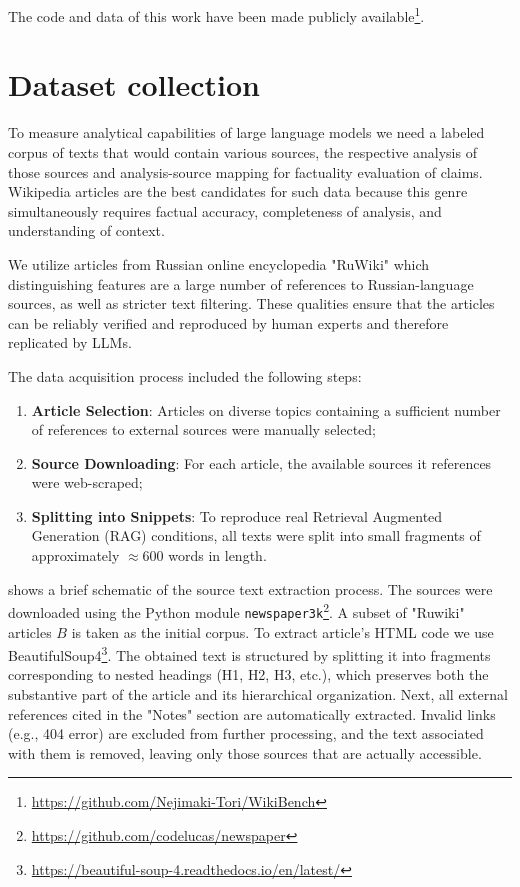 \documentclass{superfri}
\begin{document}
The code and data of this work have been made publicly available\footnote{\url{https://github.com/Nejimaki-Tori/WikiBench}}.

\section{Dataset collection}
To measure analytical capabilities of large language models we need a labeled corpus of texts that would contain various sources, 
the respective analysis of those sources and analysis-source mapping for factuality evaluation of claims. 
Wikipedia articles are the best candidates for such data because this genre simultaneously requires factual accuracy, completeness of analysis, 
and understanding of context.

We utilize articles from Russian online encyclopedia "RuWiki" which distinguishing features are a large number of references to Russian-language sources, 
as well as stricter text filtering. These qualities ensure that the articles can be reliably verified and reproduced by human experts and therefore replicated by LLMs.

The data acquisition process included the following steps:
\begin{enumerate}
\item \textbf{Article Selection}: Articles on diverse topics containing a sufficient number of references to external sources were manually selected;
\item \textbf{Source Downloading}: For each article, the available sources it references were web-scraped;
\item \parbox[t]{0.9\textwidth}{\textbf{Splitting into Snippets}: To reproduce real Retrieval Augmented Generation (RAG) conditions, all texts were split into small fragments of approximately $\approx 600$ words in length.}
\end{enumerate}



 shows a brief schematic of the source text extraction process. The sources were downloaded using the Python module \texttt{newspaper3k}\footnote{\url{https://github.com/codelucas/newspaper}}.
A subset of "Ruwiki" articles \(B\) is taken as the initial corpus.
To extract article's HTML code we use BeautifulSoup4\footnote{\url{https://beautiful-soup-4.readthedocs.io/en/latest/}}.
The obtained text is structured by splitting it into fragments corresponding to nested headings (H1, H2, H3, etc.), which preserves both the substantive part of the article and its hierarchical organization.
Next, all external references cited in the "Notes" section are automatically extracted. Invalid links (e.g., 404 error) are excluded from further processing,
and the text associated with them is removed, leaving only those sources that are actually accessible.
\end{document}
